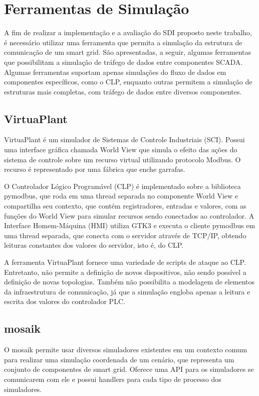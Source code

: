 \documentclass[cic,tc]{iiufrgs}
\begin{document}
\section{Ferramentas de Simulação}
\label{sectools}

A fim de realizar a implementação e a avaliação do SDI proposto neste trabalho, é necessário utilizar uma ferramenta que permita a simulação da estrutura de comunicação de um smart grid. São apresentadas, a seguir, algumas ferramentas que possibilitam a simulação de tráfego de dados entre componentes SCADA. Algumas ferramentas suportam apenas simulações do fluxo de dados em componentes específicos, como o CLP, enquanto outras permitem a simulação de estruturas mais completas, com tráfego de dados entre diversos componentes.

\subsection{VirtuaPlant}
VirtuaPlant \cite{virtuaplantwebsite} é um simulador de Sistemas de Controle Industriais (SCI). Possui uma interface gráfica chamada World View que simula o efeito das ações do sistema de controle sobre um recurso virtual utilizando protocolo Modbus. O recurso é representado por uma fábrica que enche garrafas.
	
O Controlador Lógico Programável (CLP) é implementado sobre a biblioteca pymodbus, que roda em uma thread separada no componente World View e compartilha seu contexto, que contém registradores, entradas e valores, com as funções do World View para simular recursos sendo conectados ao controlador. A Interface Homem-Máquina (HMI) utiliza GTK3 e executa o cliente pymodbus em uma thread separada, que conecta com o servidor através de TCP/IP, obtendo leituras constantes dos valores do servidor, isto é, do CLP.

A ferramenta VirtuaPlant fornece uma variedade de scripts de ataque ao CLP. Entretanto, não permite a definição de novos dispositivos, não sendo possível a definição de novas topologias. Também não possibilita a modelagem de elementos da infraestrutura de comunicação, já que a simulação engloba apenas a leitura e escrita dos valores do controlador PLC.

\subsection{mosaik}
O mosaik \cite{mosaikwebsite} permite usar diversos simuladores existentes em um contexto comum para realizar uma simulação coordenada de um cenário, que representa um conjunto de componentes de smart grid. Oferece uma API para os simuladores se comunicarem com ele e possui handlers para cada tipo de processo dos simuladores.
	
\end{document}
